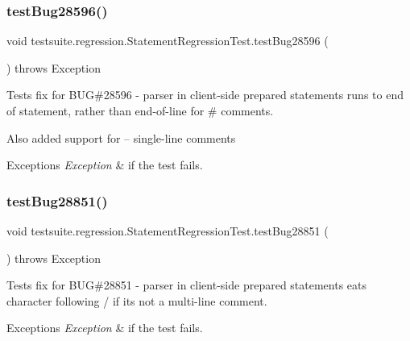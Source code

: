 \subsubsection{\texorpdfstring{test\+Bug28596()}{testBug28596()}}
{\footnotesize\ttfamily void testsuite.\+regression.\+Statement\+Regression\+Test.\+test\+Bug28596 (\begin{DoxyParamCaption}{ }\end{DoxyParamCaption}) throws Exception}

Tests fix for B\+UG\#28596 -\/ parser in client-\/side prepared statements runs to end of statement, rather than end-\/of-\/line for \textquotesingle{}\#\textquotesingle{} comments.

Also added support for \textquotesingle{}--\textquotesingle{} single-\/line comments


\begin{DoxyExceptions}{Exceptions}
{\em Exception} & if the test fails. \\
\hline
\end{DoxyExceptions}
\mbox{\label{classtestsuite_1_1regression_1_1_statement_regression_test_a466a50de4804c830422e6b7e6a9c9653}} 
\subsubsection{\texorpdfstring{test\+Bug28851()}{testBug28851()}}
{\footnotesize\ttfamily void testsuite.\+regression.\+Statement\+Regression\+Test.\+test\+Bug28851 (\begin{DoxyParamCaption}{ }\end{DoxyParamCaption}) throws Exception}

Tests fix for B\+UG\#28851 -\/ parser in client-\/side prepared statements eats character following \textquotesingle{}/\textquotesingle{} if it\textquotesingle{}s not a multi-\/line comment.


\begin{DoxyExceptions}{Exceptions}
{\em Exception} & if the test fails. \\
\hline
\end{DoxyExceptions}
\mbox{\label{classtestsuite_1_1regression_1_1_statement_regression_test_a7cb27931fda37ceec6733fcd0e95ced5}} 
